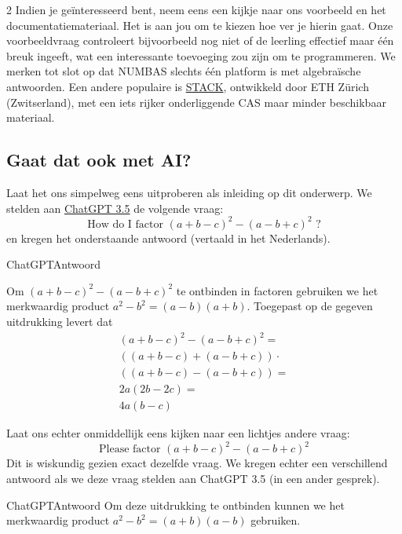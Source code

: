 \begin{multicols} {2}
    Indien je geïnteresseerd bent, neem eens een kijkje naar ons voorbeeld en het documentatiemateriaal.
    Het is aan jou om te kiezen hoe ver je hierin gaat.
    Onze voorbeeldvraag controleert bijvoorbeeld nog niet of de leerling effectief maar één breuk ingeeft, wat een interessante toevoeging zou zijn om te programmeren.
    We merken tot slot op dat NUMBAS slechts één platform is met algebraïsche antwoorden.
    Een andere populaire is \href{https://stack-assessment.org/}{STACK}, ontwikkeld door ETH Zürich (Zwitserland), met een iets rijker onderliggende CAS maar minder beschikbaar materiaal.

    \subsection{Gaat dat ook met AI?}
    Laat het ons simpelweg eens uitproberen als inleiding op dit onderwerp.
    We stelden aan \href{https://chatgpt.com/}{ChatGPT 3.5} de volgende vraag:
    \[
    \text{How do I factor }\left(a+b-c\right)^2 - \left(a-b+c\right)^2\text{ ?}
    \]
    en kregen het onderstaande antwoord (vertaald in het Nederlands).
    \begin{kader}{ChatGPT}{Antwoord}
        \begin{minipage}{\textwidth}
        Om \(\left(a+b-c\right)^2 - \left(a-b+c\right)^2\) te ontbinden in factoren gebruiken we het merkwaardig product \(a^2-b^2=(a-b)(a+b)\).\newline
        Toegepast op de gegeven uitdrukking levert dat
        \[
        \begin{array}{l}
        \left(a+b-c\right)^2 - \left(a-b+c\right)^2 =\\ 
        \left((a+b-c)+(a-b+c)\right) \cdot\\
        \left((a+b-c)-(a-b+c)\right)= \\
            2a\left(2b-2c\right)=\\
            4a(b-c)
        \end{array}
        \]
        \end{minipage}
    \end{kader}
    Laat ons echter onmiddellijk eens kijken naar een lichtjes andere vraag:
    \[
    \text{Please factor }\left(a+b-c\right)^2 - \left(a-b+c\right)^2
    \]
    Dit is wiskundig gezien exact dezelfde vraag.
    We kregen echter een verschillend antwoord als we deze vraag stelden aan ChatGPT 3.5 (in een ander gesprek).
    \begin{kader}{ChatGPT}{Antwoord}
        Om deze uitdrukking te ontbinden kunnen we het merkwaardig product \(a^2 - b^2 = (a + b)(a - b)\) gebruiken.\newline

\end{kader}
\end{multicols}
